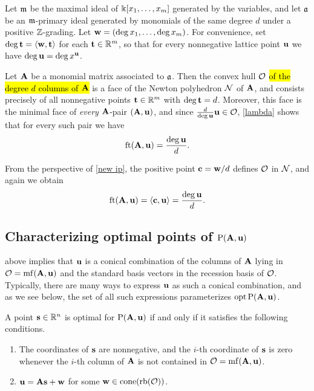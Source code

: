 \documentclass{amsart}
\begin{document}
\begin{example}
   \label{ex: m-primary homogeneous case}
   Let $\mathfrak{m}$ be the maximal ideal of  $\Bbbk[x_1,\ldots,x_m]$ generated by the variables, and let $\mathfrak{a}$ be an $\mathfrak{m}$-primary ideal generated by monomials of the same degree $d$ under a positive $\mathbb{Z}$-grading.
   Let $\mathbf{w} = (\deg x_1,\ldots,\deg x_m)$.
   For convenience, set $\deg \mathbf{t} = \langle \mathbf{w}, \mathbf{t} \rangle$ for each $\mathbf{t} \in \mathbb{R}^m$, so that for every nonnegative lattice point $\mathbf{u}$ we have $\deg \mathbf{u} = \deg x^{\mathbf{u}}$.

   Let $\mathbf{A}$ be a monomial matrix associated to $\mathfrak{a}$.
   Then the convex hull $\mathcal{O}$ \hl{of the degree $d$ columns of $\mathbf{A}$}
   is a face of the Newton polyhedron $\mathcal{N}$ of $\mathbf{A}$, and consists precisely of all nonnegative points $\mathbf{t} \in \mathbb{R}^m$ with $\deg \mathbf{t}  = d$.
   Moreover, this face is the minimal face of \emph{every} $\mathbf{A}$-pair $(\mathbf{A},\mathbf{u})$, and since $\frac d{\deg \mathbf{u}}\mathbf{u} \in \mathcal{O}$, \ref{lambda} shows that for every such pair we have
   \[
      \operatorname{ft}(\mathbf{A}, \mathbf{u}) = \frac{\deg \mathbf{u}}{d}.
   \]

   From the perspective of \ref{new ip}, the positive point $\mathbf{c} = \mathbf{w}/d$ defines $\mathcal{O}$ in $\mathcal{N}$, and again we obtain
   \[
      \operatorname{ft}(\mathbf{A}, \mathbf{u}) = \langle \mathbf{c}, \mathbf{u} \rangle = \frac{\deg \mathbf{u}}{d}.
   \]
\end{example}

\subsection{Characterizing optimal points of $\mathrm{P}(\mathbf{A},\mathbf{u})$}

 above implies that $\mathbf{u}$ is a conical combination of the columns of $\mathbf{A}$ lying in $\mathcal{O} = \operatorname{mf}(\mathbf{A},\mathbf{u})$ and the standard basis vectors in the recession basis of $\mathcal{O}$.
Typically, there are many ways to express $\mathbf{u}$ as such a conical combination, and as we see below, the set of all such expressions parameterizes  $\operatorname{opt} \mathrm{P}(\mathbf{A}, \mathbf{u})$.

\begin{proposition}
   \label{opt set: P}
   A point $\mathbf{s} \in \mathbb{R}^n$ is optimal for $\mathrm{P}(\mathbf{A}, \mathbf{u})$ if and only if it satisfies the following conditions.
\begin{enumerate}[$(1)$]
\item  \label{mc coords: e} The coordinates of $\mathbf{s}$ are nonnegative, and the $i$-th coordinate of $\mathbf{s}$ is zero whenever the $i$-th column of $\mathbf{A}$ is not contained in $\mathcal{O} = \operatorname{mf}(\mathbf{A}, \mathbf{u})$.
\item  \label{mc decomposition: e} $\mathbf{u} = \mathbf{A} \mathbf{s} + \mathbf{w}$ for some $\mathbf{w} \in  \operatorname{cone}(\operatorname{rb}(\mathcal{O}))$.
\end{enumerate}
\end{proposition}
\end{document}
